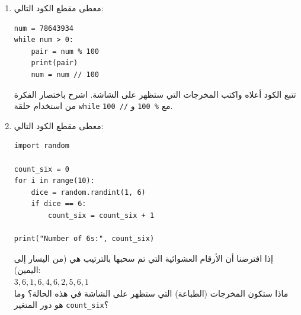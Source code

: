 \documentclass[14pt]{extarticle}
\begin{document}
\begin{enumerate}[itemsep=2em]
    \clearpage
    \item
    معطى مقطع الكود التالي:
    \begin{boxCode}
    \begin{english}
    \begin{verbatim}
num = 78643934
while num > 0:
    pair = num % 100
    print(pair)
    num = num // 100
    \end{verbatim}
    \end{english}
    \end{boxCode}
    تتبع الكود أعلاه واكتب المخرجات التي ستظهر على الشاشة. اشرح باختصار الفكرة من استخدام حلقة \texttt{while} مع \texttt{\%\ 100} و \texttt{//\ 100}.

    \item
    معطى مقطع الكود التالي:
    \begin{boxCode}
    \begin{english}
    \begin{verbatim}
import random

count_six = 0
for i in range(10):
    dice = random.randint(1, 6)
    if dice == 6:
        count_six = count_six + 1

print("Number of 6s:", count_six)
    \end{verbatim}
    \end{english}
    \end{boxCode}
    إذا افترضنا أن الأرقام العشوائية التي تم سحبها بالترتيب هي (من اليسار إلى اليمين): \\
    $3, 6, 1, 6, 4, 6, 2, 5, 6, 1$ \\
    ماذا ستكون المخرجات (الطباعة) التي ستظهر على الشاشة في هذه الحالة؟ وما هو دور المتغير \texttt{count\_six}؟
\end{enumerate}
\end{document}
